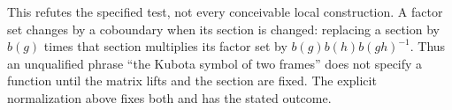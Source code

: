 This refutes the specified test, not every conceivable local
construction.  A factor set changes by a coboundary when its
section is changed: replacing a section by $b(g)$ times that
section multiplies its factor set by
$b(g)b(h)b(gh)^{-1}$.  Thus an unqualified phrase ``the Kubota
symbol of two frames'' does not specify a function until the
matrix lifts and the section are fixed.  The explicit
normalization above fixes both and has the stated outcome.
